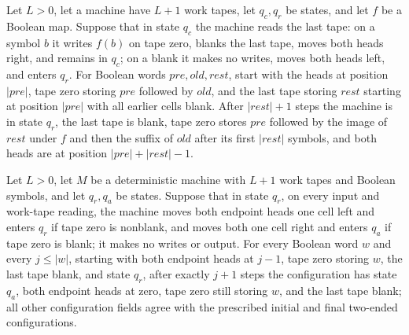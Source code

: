 \begin{lemma}
\label{Complexity.enumCont_copy_scan}
\leanok
{}
Let $L>0$, let a machine have $L+1$ work tapes, let $q_c,q_r$ be states, and let $f$ be
a Boolean map. Suppose that in state $q_c$ the machine reads the last tape: on a symbol
$b$ it writes $f(b)$ on tape zero, blanks the last tape, moves both heads right, and
remains in $q_c$; on a blank it makes no writes, moves both heads left, and enters
$q_r$. For Boolean words $\mathit{pre},\mathit{old},\mathit{rest}$, start with the heads
at position $|\mathit{pre}|$, tape zero storing $\mathit{pre}$ followed by
$\mathit{old}$, and the last tape storing $\mathit{rest}$ starting at position
$|\mathit{pre}|$ with all earlier cells blank. After $|\mathit{rest}|+1$ steps the
machine is in state $q_r$, the last tape is blank, tape zero stores $\mathit{pre}$
followed by the image of $\mathit{rest}$ under $f$ and then the suffix of $\mathit{old}$
after its first $|\mathit{rest}|$ symbols, and both heads are at position
$|\mathit{pre}|+|\mathit{rest}|-1$.
\end{lemma}

\begin{lemma}
\label{Complexity.enumCont_pair_rewind}
\leanok
{}
Let $L>0$, let $M$ be a deterministic machine with $L+1$ work tapes and Boolean symbols,
and let $q_r,q_a$ be states. Suppose that in state $q_r$, on every input and work-tape
reading, the machine moves both endpoint heads one cell left and enters $q_r$ if tape
zero is nonblank, and moves both one cell right and enters $q_a$ if tape zero is blank;
it makes no writes or output. For every Boolean word $w$ and every $j\le |w|$, starting
with both endpoint heads at $j-1$, tape zero storing $w$, the last tape blank, and state
$q_r$, after exactly $j+1$ steps the configuration has state $q_a$, both endpoint heads
at zero, tape zero still storing $w$, and the last tape blank; all other configuration
fields agree with the prescribed initial and final two-ended configurations.
\end{lemma}

